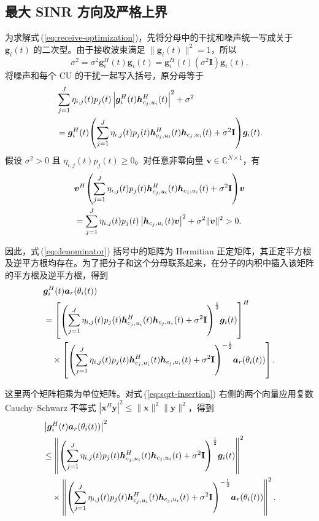 \documentclass[11pt,a4paper]{ctexart}
\begin{document}
\subsection{最大 SINR 方向及严格上界}
为求解式\,(\ref{eq:receive-optimization})，先将分母中的干扰和噪声统一写成关于 $\bm g_i(t)$ 的二次型。由于接收波束满足 $\|\bm g_i(t)\|^2=1$，所以
\begin{equation}
\sigma^2=\sigma^2\bm g_i^H(t)\bm g_i(t)
=\bm g_i^H(t)(\sigma^2\mathbf I)\bm g_i(t).
\end{equation}
将噪声和每个 CU 的干扰一起写入括号，原分母等于
\begin{align}\label{eq:denominator}
&\sum_{j=1}^J\eta_{i,j}(t)p_j(t)
\left|\bm g_i^H(t)\bm h_{c_j,u_i}^{H}(t)\right|^2+\sigma^2\notag\\
&=\bm g_i^H(t)\!\left(\sum_{j=1}^J\eta_{i,j}(t)p_j(t)
\bm h_{c_j,u_i}^{H}(t)\bm h_{c_j,u_i}(t)+\sigma^2\mathbf I\right)\!\bm g_i(t).
\end{align}
假设 $\sigma^2>0$ 且 $\eta_{i,j}(t)p_j(t)\ge0$。对任意非零向量 $\bm v\in\mathbb C^{N\times1}$，有
\begin{align}
&\bm v^H\!\left(\sum_{j=1}^J\eta_{i,j}(t)p_j(t)
\bm h_{c_j,u_i}^{H}(t)\bm h_{c_j,u_i}(t)+\sigma^2\mathbf I\right)\!\bm v\notag\\
&=\sum_{j=1}^J\eta_{i,j}(t)p_j(t)
\left|\bm h_{c_j,u_i}(t)\bm v\right|^2+\sigma^2\|\bm v\|^2>0.
\end{align}
\begin{samepage}
因此，式\,(\ref{eq:denominator}) 括号中的矩阵为 Hermitian 正定矩阵，其正定平方根及逆平方根均存在。为了把分子和这个分母联系起来，在分子的内积中插入该矩阵的平方根及逆平方根，得到
\begin{align}\label{eq:sqrt-insertion}
&\bm g_i^H(t)\bm a_r(\theta_i(t))\notag\\
&=\left[\left(\sum_{j=1}^J\eta_{i,j}(t)p_j(t)
\bm h_{c_j,u_i}^{H}(t)\bm h_{c_j,u_i}(t)+\sigma^2\mathbf I\right)^{\frac12}\!\bm g_i(t)\right]^H\notag\\
&\quad\times\left[\left(\sum_{j=1}^J\eta_{i,j}(t)p_j(t)
\bm h_{c_j,u_i}^{H}(t)\bm h_{c_j,u_i}(t)+\sigma^2\mathbf I\right)^{-\frac12}\!\bm a_r(\theta_i(t))\right].
\end{align}
\end{samepage}
\begin{samepage}
这里两个矩阵相乘为单位矩阵。对式\,(\ref{eq:sqrt-insertion}) 右侧的两个向量应用复数 Cauchy--Schwarz 不等式 $|\bm x^H\bm y|^2\le\|\bm x\|^2\|\bm y\|^2$，得到
\begin{align}\label{eq:cs-norms}
&\left|\bm g_i^H(t)\bm a_r(\theta_i(t))\right|^2\notag\\
&\le\left\|\left(\sum_{j=1}^J\eta_{i,j}(t)p_j(t)
\bm h_{c_j,u_i}^{H}(t)\bm h_{c_j,u_i}(t)+\sigma^2\mathbf I\right)^{\frac12}\!\bm g_i(t)\right\|^2\notag\\
&\quad\times\left\|\left(\sum_{j=1}^J\eta_{i,j}(t)p_j(t)
\bm h_{c_j,u_i}^{H}(t)\bm h_{c_j,u_i}(t)+\sigma^2\mathbf I\right)^{-\frac12}\!\bm a_r(\theta_i(t))\right\|^2.
\end{align}
\end{samepage}
\end{document}
